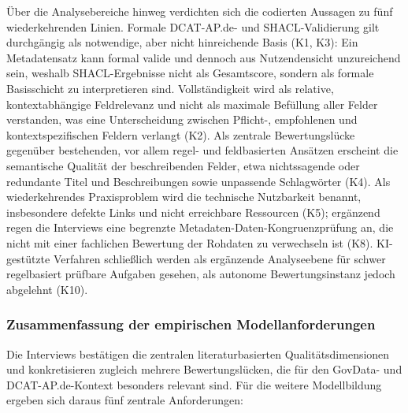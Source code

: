 
Über die Analysebereiche hinweg verdichten sich die codierten Aussagen zu fünf wiederkehrenden Linien. Formale DCAT-AP.de- und SHACL-Validierung gilt durchgängig als notwendige, aber nicht hinreichende Basis (K1, K3): Ein Metadatensatz kann formal valide und dennoch aus Nutzendensicht unzureichend sein, weshalb SHACL-Ergebnisse nicht als Gesamtscore, sondern als formale Basisschicht zu interpretieren sind. Vollständigkeit wird als relative, kontextabhängige Feldrelevanz und nicht als maximale Befüllung aller Felder verstanden, was eine Unterscheidung zwischen Pflicht-, empfohlenen und kontextspezifischen Feldern verlangt (K2). Als zentrale Bewertungslücke gegenüber bestehenden, vor allem regel- und feldbasierten Ansätzen erscheint die semantische Qualität der beschreibenden Felder, etwa nichtssagende oder redundante Titel und Beschreibungen sowie unpassende Schlagwörter (K4). Als wiederkehrendes Praxisproblem wird die technische Nutzbarkeit benannt, insbesondere defekte Links und nicht erreichbare Ressourcen (K5); ergänzend regen die Interviews eine begrenzte Metadaten-Daten-Kongruenzprüfung an, die nicht mit einer fachlichen Bewertung der Rohdaten zu verwechseln ist (K8). KI-gestützte Verfahren schließlich werden als ergänzende Analyseebene für schwer regelbasiert prüfbare Aufgaben gesehen, als autonome Bewertungsinstanz jedoch abgelehnt (K10).

\subsubsection{Zusammenfassung der empirischen Modellanforderungen}

Die Interviews bestätigen die zentralen literaturbasierten Qualitätsdimensionen und konkretisieren zugleich mehrere Bewertungslücken, die für den GovData- und DCAT-AP.de-Kontext besonders relevant sind. Für die weitere Modellbildung ergeben sich daraus fünf zentrale Anforderungen:

